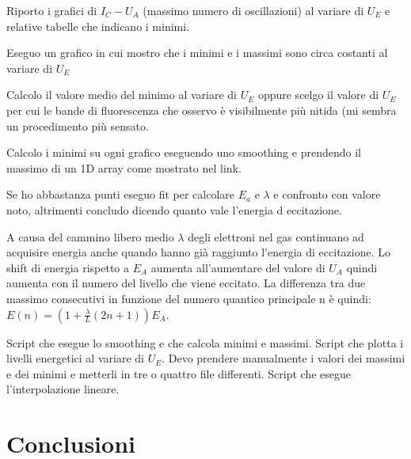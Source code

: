 \documentclass[10pt,a4paper]{article}
\begin{document}
Riporto i grafici di $I_C-U_A$ (massimo numero di oscillazioni) al variare di $U_E$ e relative tabelle che indicano i minimi.

Eseguo un grafico in cui mostro che i minimi e i massimi sono circa costanti al variare di $U_E$

Calcolo il valore medio del minimo al variare di $U_E$ oppure scelgo il valore di $U_E$ per cui le bande di fluorescenza che osservo è visibilmente più nitida (mi sembra un procedimento più sensato.

Calcolo i minimi su ogni grafico eseguendo uno smoothing e prendendo il massimo di un 1D array come mostrato nel link.

Se ho abbastanza punti eseguo fit per calcolare $E_a$ e $\lambda$ e confronto con valore noto, altrimenti concludo dicendo quanto vale l'energia d eccitazione. 

A causa del cammino libero medio $\lambda$ degli elettroni nel gas continuano ad acquisire energia anche quando hanno già raggiunto l'energia di eccitazione. Lo shift di energia rispetto a $E_A$ aumenta all'aumentare del valore di $U_A$ quindi aumenta con il numero del livello che viene eccitato. La differenza tra due massimo consecutivi in funzione del numero quantico principale n è quindi: $E(n) = ( 1 + \frac{\lambda}{L} ( 2 n + 1 ) ) E_A$. 

Script che esegue lo smoothing e che calcola minimi e massimi.
Script che plotta i livelli energetici al variare di $U_E$.
Devo prendere manualmente i valori dei massimi e dei minimi e metterli in tre o quattro file differenti.
Script che esegue l'interpolazione lineare.
 

\section{Conclusioni}
\end{document}
